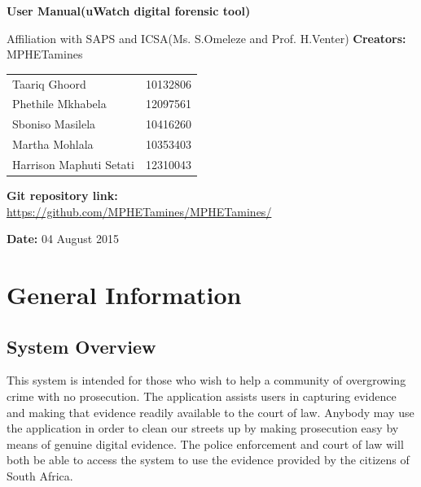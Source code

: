 \documentclass[a4paper,12pt]{article}
\begin{document}
\begin{center}

\Huge\textbf{User Manual(uWatch digital forensic tool)\\}
																											
\vspace{2 cm}
Affiliation with SAPS and ICSA(Ms. S.Omeleze and Prof. H.Venter)\newline 
\vspace{2 cm}
\LARGE\textbf{Creators:} MPHETamines
\begin{tabular}{lr}
Taariq Ghoord&10132806
\\
Phethile Mkhabela&12097561
\\
Sboniso Masilela&10416260
\\ 
Martha Mohlala&10353403
\\
Harrison Maphuti Setati&12310043\\
\end{tabular}

\vspace{1cm}
\textbf{Git repository link:\\}
\url{https://github.com/MPHETamines/MPHETamines/}

\vspace{1cm}
\textbf{Date:} 04 August 2015
\end{center}
\newpage

\tableofcontents

\newpage
{}

\section{General Information}
\subsection{System Overview}
This system is intended for those who wish to help a community of overgrowing crime with no prosecution. The application assists users in capturing evidence and making that evidence readily available to the court of law. Anybody may use the application in order to clean our streets up by making prosecution easy by means of genuine digital evidence. The police enforcement and court of law will both be able to access the system to use the evidence provided by the citizens of South Africa.
\end{document}
